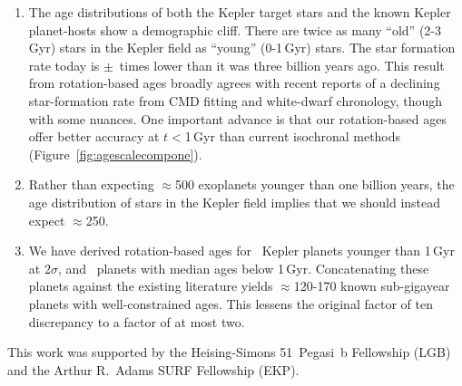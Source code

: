 \documentclass[11pt,twocolumn,tighten]{aastex63}
\begin{document}
\begin{enumerate}[leftmargin=*,topsep=0pt,itemsep=-1ex,partopsep=1ex,parsep=1ex]
  \item The age distributions of both the Kepler target stars and the
    known Kepler planet-hosts show a demographic cliff.  There are
    twice as many ``old'' (2-3\,Gyr) stars in the
    Kepler field as ``young'' (0-1\,Gyr) stars.  The star formation
    rate today is \ratiosfr$\pm$\uncratiosfr\ times lower than it was
    three billion years ago.
    This result from rotation-based ages broadly agrees with recent reports of
    a declining star-formation rate
    from CMD fitting and white-dwarf chronology, though with
    some nuances.
    One important advance is that our
    rotation-based ages offer better accuracy at $t$$<$1\,Gyr
    than current isochronal methods (Figure~\ref{fig:agescalecompone}).
  \item Rather than expecting $\approx$500 exoplanets younger than one
    billion years, the age distribution of stars in the
    Kepler field implies that we should instead expect $\approx$250.
  \item We have derived rotation-based ages for
    \nplyounggyrotwosigma\ Kepler planets younger than 1\,Gyr at 2$\sigma$,
    and \nplyounggyro\ planets with median ages below 1\,Gyr.
    Concatenating these planets against the existing literature yields
    $\approx$120-170 known sub-gigayear planets with well-constrained
    ages.  This lessens the original factor of ten discrepancy to
    a factor of at most two.
\end{enumerate}


\acknowledgements
This work was supported by the Heising-Simons 51~Pegasi~b Fellowship
(LGB)
and the Arthur R.~Adams SURF Fellowship (EKP).




\end{document}
